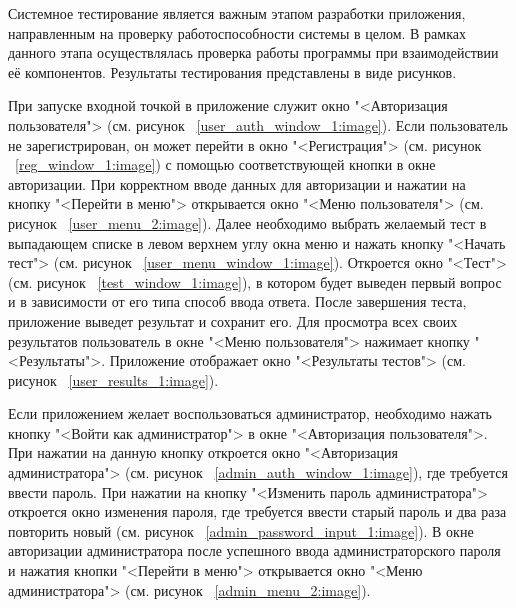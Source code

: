 Системное тестирование является важным этапом разработки приложения, направленным на проверку работоспособности системы в целом. В рамках данного этапа осуществлялась проверка работы программы при взаимодействии её компонентов. Результаты тестирования представлены в виде рисунков.

При запуске входной точкой в приложение служит окно "<Авторизация пользователя"> (см. рисунок ~\ref{user_auth_window_1:image}). Если пользователь не зарегистрирован, он может перейти в окно "<Регистрация"> (см. рисунок ~\ref{reg_window_1:image}) с помощью соответствующей кнопки в окне авторизации. При корректном вводе данных для авторизации и нажатии на кнопку "<Перейти в меню"> открывается окно "<Меню пользователя"> (см. рисунок ~\ref{user_menu_2:image}). Далее необходимо выбрать желаемый тест в выпадающем списке в левом верхнем углу окна меню и нажать кнопку "<Начать тест"> (см. рисунок ~\ref{user_menu_window_1:image}). Откроется окно "<Тест"> (см. рисунок ~\ref{test_window_1:image}), в котором будет выведен первый вопрос и в зависимости от его типа способ ввода ответа. После завершения теста, приложение выведет результат и сохранит его. Для просмотра всех своих результатов пользователь в окне "<Меню пользователя"> нажимает кнопку "<Результаты">. Приложение отображает окно "<Результаты тестов"> (см. рисунок ~\ref{user_results_1:image}).

Если приложением желает воспользоваться администратор, необходимо нажать кнопку "<Войти как администратор"> в окне "<Авторизация пользователя">. При нажатии на данную кнопку откроется окно "<Авторизация администратора"> (см. рисунок ~\ref{admin_auth_window_1:image}), где требуется ввести пароль. При нажатии на кнопку "<Изменить пароль администратора"> откроется окно изменения пароля, где требуется ввести старый пароль и два раза повторить новый (см. рисунок ~\ref{admin_password_input_1:image}). В окне авторизации администратора после успешного ввода администраторского пароля и нажатия кнопки "<Перейти в меню"> открывается окно "<Меню администратора"> (см. рисунок ~\ref{admin_menu_2:image}).

